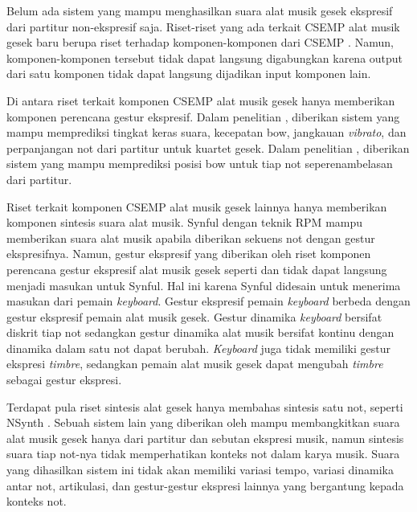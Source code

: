 Belum ada sistem yang mampu menghasilkan suara alat musik gesek ekspresif dari partitur non-ekspresif saja. Riset-riset yang ada terkait CSEMP alat musik gesek baru berupa riset terhadap komponen-komponen dari CSEMP \parencite{marchini2014quartet} \parencite{yu2017bowing} \parencite{lindemann2007rpm} \parencite{yang2016synthesis} \parencite{nsynth2017}. Namun, komponen-komponen tersebut tidak dapat langsung digabungkan karena output dari satu komponen tidak dapat langsung dijadikan input komponen lain.

Di antara riset terkait komponen CSEMP alat musik gesek hanya memberikan komponen perencana gestur ekspresif. Dalam penelitian \citet{marchini2014quartet}, diberikan sistem yang mampu memprediksi tingkat keras suara, kecepatan bow, jangkauan \textit{vibrato}, dan perpanjangan not dari partitur untuk kuartet gesek. Dalam penelitian \citet{yu2017bowing}, diberikan sistem yang mampu memprediksi posisi bow untuk tiap not seperenambelasan dari partitur.

Riset terkait komponen CSEMP alat musik gesek lainnya hanya memberikan komponen sintesis suara alat musik. Synful dengan teknik RPM \parencite{lindemann2007rpm} mampu memberikan suara alat musik apabila diberikan sekuens not dengan gestur ekspresifnya. Namun, gestur ekspresif yang diberikan oleh riset komponen perencana gestur ekspresif alat musik gesek seperti \parencite{marchini2014quartet} dan \parencite{yu2017bowing} tidak dapat langsung menjadi masukan untuk Synful. Hal ini karena Synful didesain untuk menerima masukan dari pemain \textit{keyboard}. Gestur ekspresif pemain \textit{keyboard} berbeda dengan gestur ekspresif pemain alat musik gesek. Gestur dinamika \textit{keyboard} bersifat diskrit tiap not sedangkan gestur dinamika alat musik bersifat kontinu dengan dinamika dalam satu not dapat berubah. \textit{Keyboard} juga tidak memiliki gestur ekspresi \textit{timbre}, sedangkan pemain alat musik gesek dapat mengubah \textit{timbre} sebagai gestur ekspresi.

Terdapat pula riset sintesis alat gesek hanya membahas sintesis satu not, seperti NSynth \parencite{nsynth2017}. Sebuah sistem lain yang diberikan oleh \citet{yang2016synthesis} mampu membangkitkan suara alat musik gesek hanya dari partitur dan sebutan ekspresi musik, namun sintesis suara tiap not-nya tidak memperhatikan konteks not dalam karya musik. Suara yang dihasilkan sistem ini tidak akan memiliki variasi tempo, variasi dinamika antar not, artikulasi, dan gestur-gestur ekspresi lainnya yang bergantung kepada konteks not.

